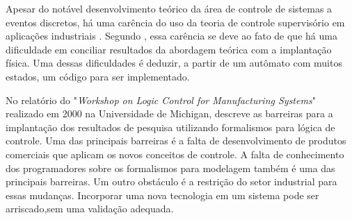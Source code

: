 








Apesar do not\'avel desenvolvimento te\'orico da \'area de controle de sistemas a eventos discretos, h\'a uma car\^encia do uso da teoria de controle supervis\'orio em aplica\c{c}\~oes industriais \cite{queiroz2002}. Segundo \cite{fabian}, essa car\^encia se deve ao fato de que h\'a uma dificuldade em conciliar resultados da abordagem te\'orica com a implanta\c{c}\~ao f\'isica. Uma dessas dificuldades \'e deduzir, a partir de um aut\^omato com muitos estados, um c\'odigo para ser implementado.

No relat\'orio do "\textit{Workshop on Logic Control for Manufacturing Systems}" \space realizado em 2000 na Universidade de Michigan, \cite{workshop2000} descreve as barreiras para a implanta\c{c}\~ao dos resultados de pesquisa utilizando formalismos para l\'ogica de controle. Uma das principais barreiras \'e a falta de desenvolvimento de produtos comerciais que aplicam os novos conceitos de controle. A falta de conhecimento dos programadores sobre os formalismos para modelagem tamb\'em \'e uma das principais barreiras. Um outro obst\'aculo \'e a restri\c{c}\~ao do setor industrial para essas mudan\c{c}as. Incorporar uma nova tecnologia em um sistema pode ser arriscado,sem uma valida\c{c}\~ao adequada.


